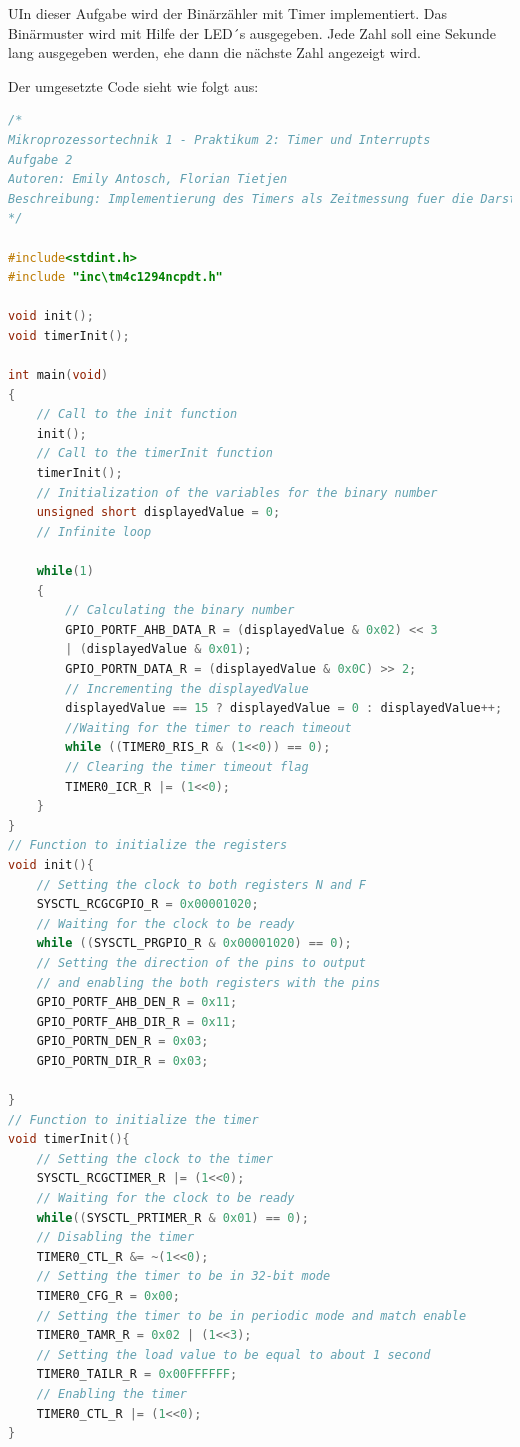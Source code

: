 \documentclass{article}
\begin{document}
\begin{task}
UIn dieser Aufgabe wird der Binärzähler mit Timer implementiert. Das Binärmuster wird mit Hilfe der LED´s ausgegeben. Jede Zahl soll eine Sekunde lang ausgegeben werden, ehe dann die nächste Zahl angezeigt wird. 
\end{task}
  
Der umgesetzte Code sieht wie folgt aus:
  
\begin{lstlisting}[language=c, caption={timer.c}, captionpos=b]
/*
Mikroprozessortechnik 1 - Praktikum 2: Timer und Interrupts
Aufgabe 2
Autoren: Emily Antosch, Florian Tietjen
Beschreibung: Implementierung des Timers als Zeitmessung fuer die Darstellung von Binaerzahlen mithilfe von LEDs auf dem Evaluation Board.
*/

#include<stdint.h>
#include "inc\tm4c1294ncpdt.h"

void init();
void timerInit();

int main(void)
{
    // Call to the init function
    init();
    // Call to the timerInit function
    timerInit();
    // Initialization of the variables for the binary number
    unsigned short displayedValue = 0;
    // Infinite loop

    while(1)
    {
        // Calculating the binary number
        GPIO_PORTF_AHB_DATA_R = (displayedValue & 0x02) << 3 
        | (displayedValue & 0x01);
        GPIO_PORTN_DATA_R = (displayedValue & 0x0C) >> 2;
        // Incrementing the displayedValue
        displayedValue == 15 ? displayedValue = 0 : displayedValue++;
        //Waiting for the timer to reach timeout
        while ((TIMER0_RIS_R & (1<<0)) == 0);
        // Clearing the timer timeout flag
        TIMER0_ICR_R |= (1<<0);
    }
}
// Function to initialize the registers
void init(){
    // Setting the clock to both registers N and F
    SYSCTL_RCGCGPIO_R = 0x00001020;
    // Waiting for the clock to be ready
    while ((SYSCTL_PRGPIO_R & 0x00001020) == 0);
    // Setting the direction of the pins to output
    // and enabling the both registers with the pins
    GPIO_PORTF_AHB_DEN_R = 0x11;
    GPIO_PORTF_AHB_DIR_R = 0x11;
    GPIO_PORTN_DEN_R = 0x03;
    GPIO_PORTN_DIR_R = 0x03;

}
// Function to initialize the timer
void timerInit(){
    // Setting the clock to the timer
    SYSCTL_RCGCTIMER_R |= (1<<0);
    // Waiting for the clock to be ready
    while((SYSCTL_PRTIMER_R & 0x01) == 0);
    // Disabling the timer
    TIMER0_CTL_R &= ~(1<<0);
    // Setting the timer to be in 32-bit mode
    TIMER0_CFG_R = 0x00;
    // Setting the timer to be in periodic mode and match enable
    TIMER0_TAMR_R = 0x02 | (1<<3);
    // Setting the load value to be equal to about 1 second
    TIMER0_TAILR_R = 0x00FFFFFF;
    // Enabling the timer
    TIMER0_CTL_R |= (1<<0);
}

\end{lstlisting}
\end{document}
